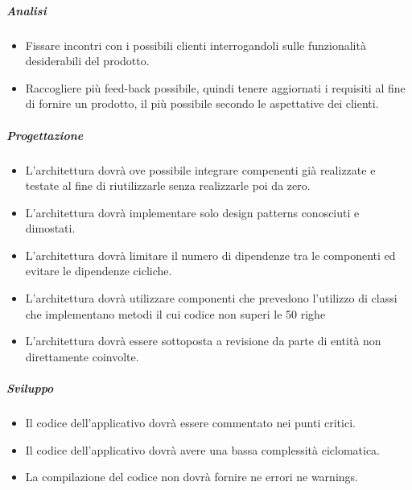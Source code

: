 \subparagraph{Analisi}
\begin{itemize}
\item Fissare incontri con i possibili clienti interrogandoli sulle funzionalit\`{a} desiderabili del prodotto.
\item Raccogliere pi\`{u} feed-back possibile, quindi tenere aggiornati i requisiti al fine di fornire un prodotto, il pi\`{u} possibile secondo le aspettative dei clienti.
\end{itemize}
\subparagraph{Progettazione}
\begin{itemize}
\item L\textquoteright{}architettura dovr\`{a} ove possibile integrare compenenti gi\`{a} realizzate e testate al fine di riutilizzarle senza realizzarle poi da zero.
\item L\textquoteright{}architettura dovr\`{a} implementare solo design patterns conosciuti e dimostati.
\item L\textquoteright{}architettura dovr\`{a} limitare il numero di dipendenze tra le componenti ed evitare le dipendenze cicliche.
\item L\textquoteright{}architettura dovr\`{a} utilizzare componenti che prevedono l\textquoteright{}utilizzo di classi che implementano metodi il cui codice non superi le 50 righe
\item L\textquoteright{}architettura dovr\`{a} essere sottoposta a revisione da parte di entit\`{a} non direttamente coinvolte. 
\end{itemize}
\subparagraph{Sviluppo}
\begin{itemize}
\item Il codice dell\textquoteright{}applicativo dovr\`{a} essere commentato nei punti critici.
\item Il codice dell\textquoteright{}applicativo dovr\`{a} avere una bassa complessit\`{a} ciclomatica.
\item La compilazione del codice non dovr\`{a} fornire ne errori ne warnings.
\end{itemize}